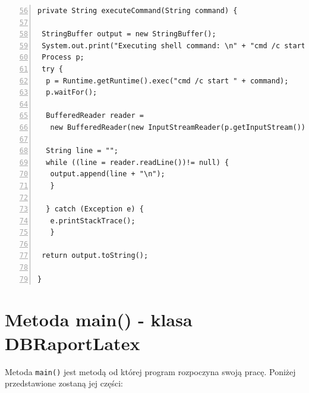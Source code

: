  \begin{lstlisting}[numbers=left,firstnumber=56]
private String executeCommand(String command) {
 
 StringBuffer output = new StringBuffer();
 System.out.print("Executing shell command: \n" + "cmd /c start " + command);
 Process p;
 try {
  p = Runtime.getRuntime().exec("cmd /c start " + command);
  p.waitFor();
                       
  BufferedReader reader = 
   new BufferedReader(new InputStreamReader(p.getInputStream()));
 
  String line = "";			
  while ((line = reader.readLine())!= null) {
   output.append(line + "\n");
   }
 
  } catch (Exception e) {
   e.printStackTrace();
   }
 
 return output.toString();
 
}

\end{lstlisting}

\section{Metoda main() - klasa DBRaportLatex }

Metoda \texttt{main()} jest metodą od której program rozpoczyna swoją pracę. Poniżej przedstawione zostaną jej części:

